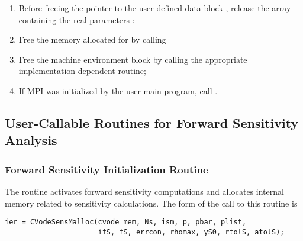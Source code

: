 \begin{enumerate}
  
\item
  Before freeing the pointer to the user-defined data block 
  , release the array containing the real parameters :
  
\item 
  Free the memory allocated for {\cvodes} by calling 
  
\item 
  Free the machine environment block by calling the appropriate {\nvector}
  implementation-dependent routine;
  
\item
  {\p} If MPI was initialized by the user main program, call .
  
\end{enumerate}

\subsection{User-Callable Routines for Forward Sensitivity Analysis}

\subsubsection{Forward Sensitivity Initialization Routine}\label{sss:cvodesensmalloc}

The routine  activates forward sensitivity computations and
allocates internal memory related to sensitivity calculations.
The form of the call to this routine is
\begin{verbatim}
ier = CVodeSensMalloc(cvode_mem, Ns, ism, p, pbar, plist, 
                      ifS, fS, errcon, rhomax, yS0, rtolS, atolS);
\end{verbatim}

